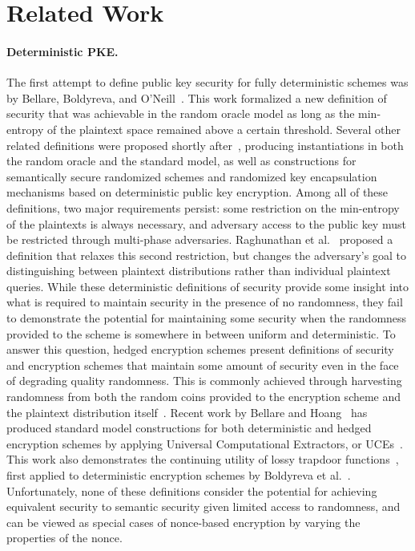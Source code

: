 \section{Related Work}
\label{rel_wk}

\paragraph{Deterministic PKE. }
The first attempt to define public key security for fully deterministic schemes was by Bellare, Boldyreva, and O'Neill~\cite{BBO07}.
This work formalized a new definition of security that was achievable in the random oracle model as long as the min-entropy
of the plaintext space remained above a certain threshold.  Several other related definitions were proposed shortly after~\cite{BFOR08,BSO08},
producing instantiations in both the random oracle and the standard model, as well as constructions for semantically secure randomized schemes
and randomized key encapsulation mechanisms based on deterministic public key encryption.
Among all of these definitions, two major requirements persist: some restriction on the min-entropy of the plaintexts is always necessary, and
adversary access to the public key must be restricted through multi-phase adversaries. Raghunathan et al.~\cite{RSV13} proposed
a definition that relaxes this second restriction, but changes the adversary's goal to distinguishing between plaintext distributions
rather than individual plaintext queries.  While these deterministic definitions of security provide some insight into what is
required to maintain security in the presence of no randomness, they fail to demonstrate the potential for maintaining some
security when the randomness provided to the scheme is somewhere in between uniform and deterministic.  To answer
this question, hedged encryption schemes present definitions of security and encryption schemes that maintain some
amount of security even in the face of degrading quality randomness.  This is commonly achieved through harvesting randomness
from both the random coins provided to the encryption scheme and the plaintext distribution itself~\cite{BBNRTSSHY2009}.  
Recent work by Bellare and Hoang~\cite{BH15}
has produced standard model constructions for both deterministic and hedged encryption schemes by applying Universal Computational Extractors,
or UCEs~\cite{BHK13}.  This work also demonstrates the continuing utility of lossy trapdoor functions~\cite{PW11}, first applied to deterministic encryption
schemes by Boldyreva et al.~\cite{BSO08}.  Unfortunately, none of these definitions consider the potential for achieving equivalent security to 
semantic security given limited access to randomness, and can be viewed as special cases of nonce-based encryption by varying the
properties of the nonce.

